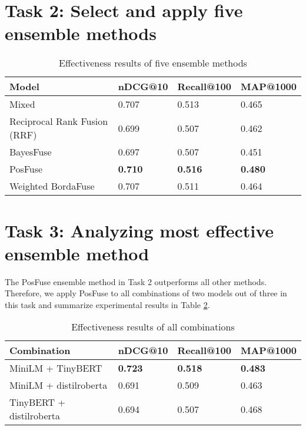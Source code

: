 \documentclass[acmsmall]{acmart}
\begin{document}
\section{Task 2: Select and apply five ensemble methods}
\begin{table}[!ht]
    \centering
    \caption{Effectiveness results of five ensemble methods}
    \label{tab:results-task2}
    \begin{tabular}{llll}
       \toprule
       \textbf{Model} &  \textbf{nDCG@10} & \textbf{Recall@100} & \textbf{MAP@1000}\\
       \midrule
       Mixed & 0.707 & 0.513 & 0.465\\
       Reciprocal Rank Fusion (RRF) & 0.699 & 0.507 & 0.462\\
       BayesFuse & 0.697 & 0.507 & 0.451\\
       PosFuse & \textbf{0.710} & \textbf{0.516} & \textbf{0.480}\\
       Weighted BordaFuse & 0.707 & 0.511 & 0.464\\
       \bottomrule
    \end{tabular}
\end{table}

\section{Task 3: Analyzing most effective ensemble method}
The PosFuse ensemble method in Task 2 outperforms all other methods. Therefore, we apply PosFuse to all combinations of two models out of three in this task and summarize experimental results in Table \ref{tab:results-task3}.
\begin{table}[!ht]
    \centering
    \caption{Effectiveness results of all combinations}
    \label{tab:results-task3}
    \begin{tabular}{llll}
       \toprule
       \textbf{Combination} & \textbf{nDCG@10} & \textbf{Recall@100} & \textbf{MAP@1000}\\
       \midrule
       MiniLM + TinyBERT & \textbf{0.723} & \textbf{0.518} & \textbf{0.483}\\
       MiniLM + distilroberta & 0.691 & 0.509 & 0.463\\
       TinyBERT + distilroberta & 0.694 & 0.507 & 0.468\\
       \bottomrule
    \end{tabular}
\end{table}
\end{document}
